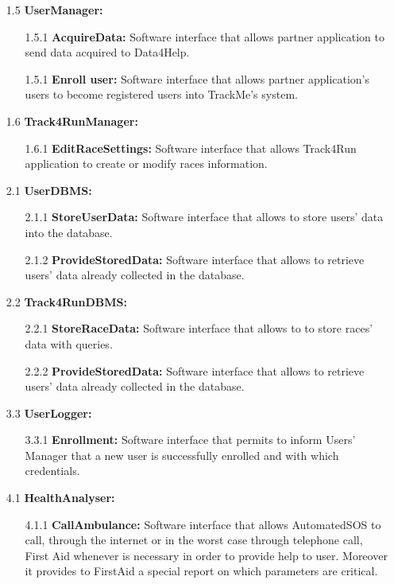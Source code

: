\begin{enumerate}
\item[1.5] \textbf{UserManager: }
	\begin{enumerate}
		\item[1.5.1] \textbf{AcquireData:} Software interface that allows partner application to send data acquired to Data4Help.
		\item[1.5.1] \textbf{Enroll user:} Software interface that allows partner application's users to become registered users into TrackMe's system.
	\end{enumerate}

\item[1.6] \textbf{Track4RunManager: }
	\begin{enumerate}
		\item[1.6.1] \textbf{EditRaceSettings:} Software interface that allows Track4Run application to create or modify races information.
	\end{enumerate}

\item[2.1] \textbf{UserDBMS: }
	\begin{enumerate}
		\item[2.1.1] \textbf{StoreUserData:} Software interface that allows to store users' data into the database.
		\item[2.1.2] \textbf{ProvideStoredData:} Software interface that allows to retrieve users' data already collected in the database.
	\end{enumerate}
	
\item[2.2] \textbf{Track4RunDBMS: }
	\begin{enumerate}
		\item[2.2.1] \textbf{StoreRaceData:} Software interface that allows to to store races' data with queries.
		\item[2.2.2] \textbf{ProvideStoredData:} Software interface that allows to retrieve users' data already collected in the database.
	\end{enumerate}
	
\item[3.3] \textbf{UserLogger: }
	\begin{enumerate}
		\item[3.3.1] \textbf{Enrollment:} Software interface that permits to inform Users' Manager that a new user is successfully enrolled and with which credentials.
	\end{enumerate}
	
\item[4.1] \textbf{HealthAnalyser: }
	\begin{enumerate}
		\item[4.1.1] \textbf{CallAmbulance:} Software interface that allows AutomatedSOS to call, through the internet or in the worst case through telephone call, First Aid whenever is necessary in order to provide help to user. Moreover it provides to FirstAid a special report on which parameters are critical.
	\end{enumerate}
	

\end{enumerate}

